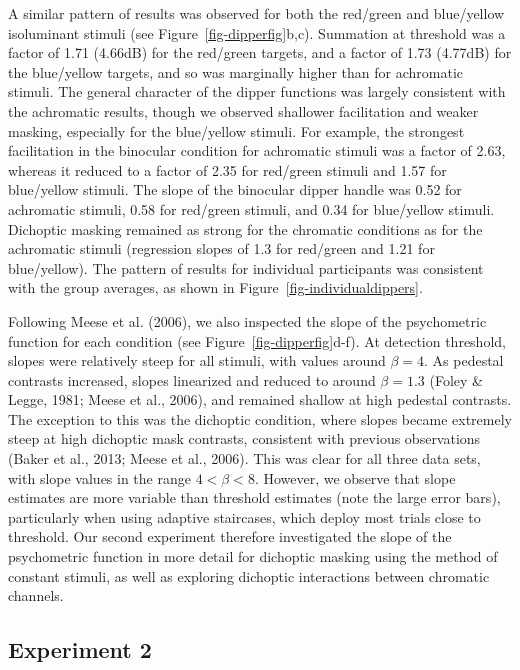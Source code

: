 \documentclass[
  letterpaper,
  DIV=11,
  numbers=noendperiod]{scrartcl}
\begin{document}
A similar pattern of results was observed for both the red/green and
blue/yellow isoluminant stimuli (see Figure~\ref{fig-dipperfig}b,c).
Summation at threshold was a factor of 1.71 (4.66dB) for the red/green
targets, and a factor of 1.73 (4.77dB) for the blue/yellow targets, and
so was marginally higher than for achromatic stimuli. The general
character of the dipper functions was largely consistent with the
achromatic results, though we observed shallower facilitation and weaker
masking, especially for the blue/yellow stimuli. For example, the
strongest facilitation in the binocular condition for achromatic stimuli
was a factor of 2.63, whereas it reduced to a factor of 2.35 for
red/green stimuli and 1.57 for blue/yellow stimuli. The slope of the
binocular dipper handle was 0.52 for achromatic stimuli, 0.58 for
red/green stimuli, and 0.34 for blue/yellow stimuli. Dichoptic masking
remained as strong for the chromatic conditions as for the achromatic
stimuli (regression slopes of 1.3 for red/green and 1.21 for
blue/yellow). The pattern of results for individual participants was
consistent with the group averages, as shown in
Figure~\ref{fig-individualdippers}.

Following Meese et al. (2006), we also inspected the slope of the
psychometric function for each condition (see
Figure~\ref{fig-dipperfig}d-f). At detection threshold, slopes were
relatively steep for all stimuli, with values around \(\beta=4\). As
pedestal contrasts increased, slopes linearized and reduced to around
\(\beta=1.3\) (Foley \& Legge, 1981; Meese et al., 2006), and remained
shallow at high pedestal contrasts. The exception to this was the
dichoptic condition, where slopes became extremely steep at high
dichoptic mask contrasts, consistent with previous observations (Baker
et al., 2013; Meese et al., 2006). This was clear for all three data
sets, with slope values in the range \(4 < \beta < 8\). However, we
observe that slope estimates are more variable than threshold estimates
(note the large error bars), particularly when using adaptive
staircases, which deploy most trials close to threshold. Our second
experiment therefore investigated the slope of the psychometric function
in more detail for dichoptic masking using the method of constant
stimuli, as well as exploring dichoptic interactions between chromatic
channels.

\hypertarget{experiment-2}{%
\subsection{Experiment 2}\label{experiment-2}}
\end{document}
